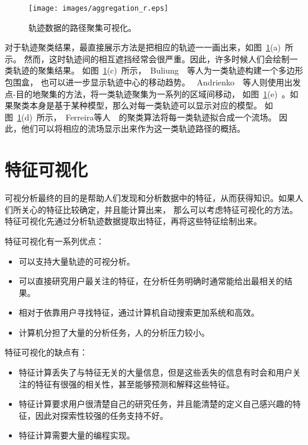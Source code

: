 \documentclass[12pt,twocolumn]{article}
\begin{document}
\begin{figure}[!htb]
\centering
\texttt{[image: images/aggregation\_r.eps]}
\caption{\label{fig:aggregation_r}轨迹数据的路径聚集可视化。
}
\end{figure}

对于轨迹聚类结果，最直接展示方法是把相应的轨迹一一画出来，如图~\ref{fig:aggregation_r}(a)~所示。
然而，这时轨迹间的相互遮挡经常会很严重。因此，许多时候人们会绘制一类轨迹的聚集结果。
如图~\ref{fig:aggregation_r}(c)~所示，~Buliung~\citep{BuliungK2004}~等人为一类轨迹构建一个多边形包围盒，
也可以进一步显示轨迹中心的移动趋势。
~Andrienko~\citep{AndrienkoARNPG2009}~等人则使用出发点-目的地聚集的方法，将一类轨迹聚集为一系列的区域间移动，
如图~\ref{fig:aggregation_r}(e)~。如果聚类本身是基于某种模型，那么对每一类轨迹可以显示对应的模型。
如图~\ref{fig:aggregation_r}(d)~所示，~Ferreira等人~\citep{FerreiraKSS2013}~的聚类算法将每一类轨迹拟合成一个流场。
因此，他们可以将相应的流场显示出来作为这一类轨迹路径的概括。

\section{特征可视化}
\label{section:extraction}

可视分析最终的目的是帮助人们发现和分析数据中的特征，从而获得知识。如果人们所关心的特征比较确定，并且能计算出来，
那么可以考虑特征可视化的方法。特征可视化先通过分析轨迹数据提取出特征，再将这些特征绘制出来。

特征可视化有一系列优点：

\begin{itemize}
	\item 可以支持大量轨迹的可视分析。
	\item 可以直接研究用户最关注的特征，在分析任务明确时通常能给出最相关的结果。
	\item 相对于依靠用户寻找特征，通过计算机自动搜索更加系统和高效。	
	\item 计算机分担了大量的分析任务，人的分析压力较小。
\end{itemize}

特征可视化的缺点有：

\begin{itemize}
	\item 特征计算丢失了与特征无关的大量信息，但是这些丢失的信息有时会和用户关注的特征有很强的相关性，甚至能够预测和解释这些特征。
	\item 特征计算要求用户很清楚自己的研究任务，并且能清楚的定义自己感兴趣的特征，因此对探索性较强的任务支持不好。
	\item 特征计算需要大量的编程实现。
\end{itemize}
\end{document}
